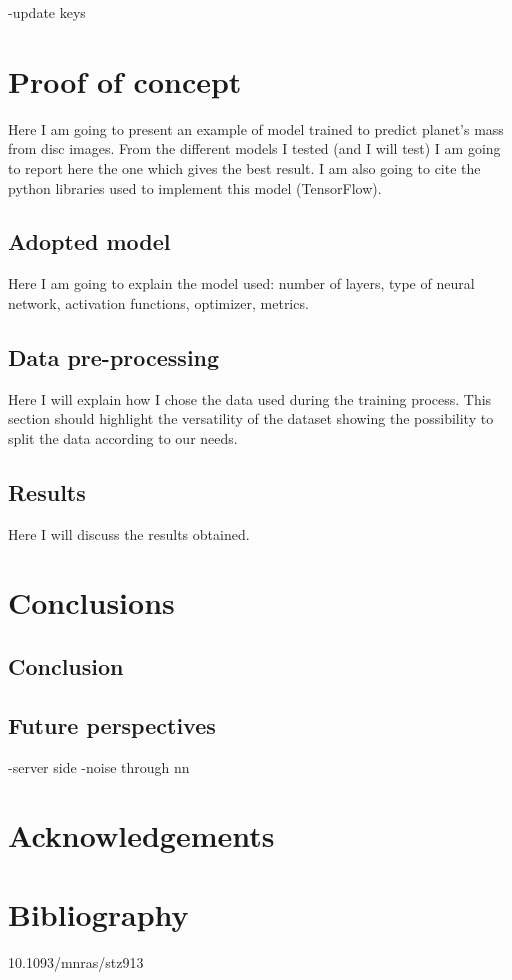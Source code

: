 \documentclass[a4paper,10pt]{report}
\begin{document}
-update keys

\chapter{Proof of concept}

Here I am going to present an example of model trained to predict planet's mass from 
disc images.
From the different models I tested (and I will test)
I am going to report here the one which gives the best result.
I am also going to cite the python libraries used to implement this model (TensorFlow).

\section{Adopted model}

Here I am going to explain the model used: number of layers, type of neural network, activation functions,
optimizer, metrics.

\section{Data pre-processing}

Here I will explain how I chose the data used during the training process.
This section should highlight the versatility of the dataset showing the possibility to split the 
data according to our needs.

\section{Results}

Here I will discuss the results obtained.

\chapter{Conclusions}
\section{Conclusion}
\section{Future perspectives}

-server side
-noise through nn

\chapter*{Acknowledgements}

\chapter*{Bibliography}

10.1093/mnras/stz913
\end{document}
